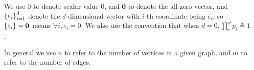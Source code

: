 We use $0$ to denote scalar value $0$, and $\mathbf{0}$ to denote the all-zero vector, and $\left\{e_i\right\}_{i=1}^{d}$ denote the $d$-dimensional vector with $i$-th coordinate being $e_i$, so $\left\{e_i\right\} = \mathbf{0}$ means $\forall i, e_i = 0$.
We also use the convention that when $d=0, \prod_i^d p_i \triangleq 1$.

In general we use $n$ to refer to the number of vertices in a given graph, and $m$ to refer to the number of edges.
